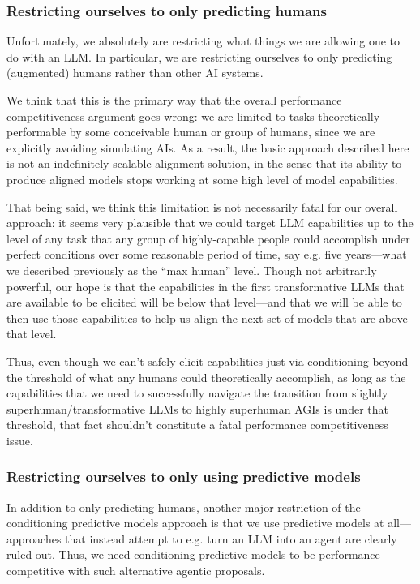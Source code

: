 \documentclass[
  twocolumn,
  natbib,
]{miri-tech-article}
\begin{document}
\subsubsection{Restricting ourselves to only predicting humans}

Unfortunately, we absolutely are restricting what things we are allowing one to do with an LLM. In particular, we are restricting ourselves to only predicting (augmented) humans rather than other AI systems.

We think that this is the primary way that the overall performance competitiveness argument goes wrong: we are limited to tasks theoretically performable by some conceivable human or group of humans, since we are explicitly avoiding simulating AIs. As a result, the basic approach described here is not an indefinitely scalable alignment solution, in the sense that its ability to produce aligned models stops working at some high level of model capabilities.

That being said, we think this limitation is not necessarily fatal for our overall approach: it seems very plausible that we could target LLM capabilities up to the level of any task that any group of highly-capable people could accomplish under perfect conditions over some reasonable period of time, say e.g. five years---what we described previously as the ``max human'' level. Though not arbitrarily powerful, our hope is that the capabilities in the first transformative LLMs that are available to be elicited will be below that level---and that we will be able to then use those capabilities to help us align the next set of models that are above that level.

Thus, even though we can't safely elicit capabilities just via conditioning beyond the threshold of what any humans could theoretically accomplish, as long as the capabilities that we need to successfully navigate the transition from slightly superhuman/transformative LLMs to highly superhuman AGIs is under that threshold, that fact shouldn't constitute a fatal performance competitiveness issue.


\subsubsection{Restricting ourselves to only using predictive models}\label{subsubsec:restricting_ourselves_to_only_using_predictive_models}

In addition to only predicting humans, another major restriction of the conditioning predictive models approach is that we use predictive models at all---approaches that instead attempt to e.g. turn an LLM into an agent are clearly ruled out. Thus, we need conditioning predictive models to be performance competitive with such alternative agentic proposals.
\end{document}
